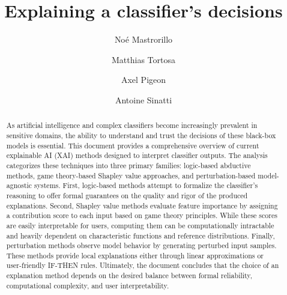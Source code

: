 \documentclass[runningheads]{llncs}
\title{Explaining a classifier's decisions}
\author{Noé Mastrorillo \and Matthias Tortosa \and Axel Pigeon \and Antoine Sinatti}
\institute{University of Toulouse, France \\
\email{\{noe.mastrorillo, matthias.tortosa, axel.pigeon, antoine.sinatti\}@utoulouse.fr}}
\begin{document}
\maketitle              

\begin{abstract}
    As artificial intelligence and complex classifiers become increasingly prevalent in sensitive 
    domains, the ability to understand and trust the decisions of these black-box models is essential. 
    This document provides a comprehensive overview of current explainable AI (XAI) methods designed 
    to interpret classifier outputs. The analysis categorizes these techniques into three primary 
    families: logic-based abductive methods, game theory-based Shapley value approaches, and 
    perturbation-based model-agnostic systems.
    First, logic-based methods attempt to formalize the classifier's reasoning to offer formal 
    guarantees on the quality and rigor of the produced explanations. Second, Shapley value 
    methods evaluate feature importance by assigning a contribution score to each input based on 
    game theory principles. While these scores are easily interpretable for users, computing them 
    can be computationally intractable and heavily dependent on characteristic functions and reference 
    distributions. Finally, perturbation methods observe model behavior by generating perturbed input 
    samples. These methods provide local explanations either through linear approximations or 
    user-friendly IF-THEN rules. Ultimately, the document concludes that the choice of an explanation 
    method depends on the desired balance between formal reliability, computational complexity, and 
    user interpretability.
\end{abstract}

\setcounter{tocdepth}{2} %
\tableofcontents

\justify







\printbibliography[title={References}]
\end{document}
